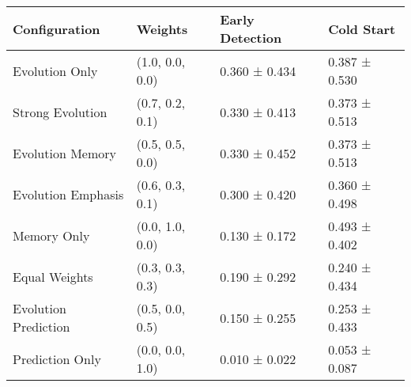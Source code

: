 \begin{tabular}{llll}
\toprule
Configuration & Weights & Early Detection & Cold Start \\
\midrule
Evolution Only & (1.0, 0.0, 0.0) & 0.360 ± 0.434 & 0.387 ± 0.530 \\
Strong Evolution & (0.7, 0.2, 0.1) & 0.330 ± 0.413 & 0.373 ± 0.513 \\
Evolution Memory & (0.5, 0.5, 0.0) & 0.330 ± 0.452 & 0.373 ± 0.513 \\
Evolution Emphasis & (0.6, 0.3, 0.1) & 0.300 ± 0.420 & 0.360 ± 0.498 \\
Memory Only & (0.0, 1.0, 0.0) & 0.130 ± 0.172 & 0.493 ± 0.402 \\
Equal Weights & (0.3, 0.3, 0.3) & 0.190 ± 0.292 & 0.240 ± 0.434 \\
Evolution Prediction & (0.5, 0.0, 0.5) & 0.150 ± 0.255 & 0.253 ± 0.433 \\
Prediction Only & (0.0, 0.0, 1.0) & 0.010 ± 0.022 & 0.053 ± 0.087 \\
\bottomrule
\end{tabular}
